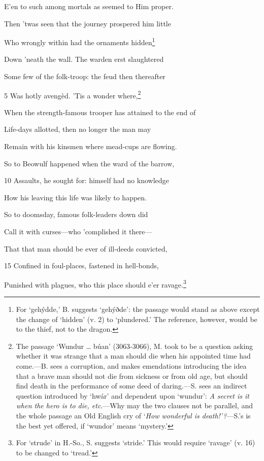 E’en to such among mortals as seemed to Him proper.



Then ’twas seen that the journey prospered him little

Who wrongly within had the ornaments hidden\footnote{For ‘gehýdde,’ B. suggests ‘gehýðde’: the passage would stand as above
except the change of ‘hidden’ (v. 2) to ‘plundered.’ The reference, however,
would be to the thief, not to the dragon.}

Down ’neath the wall. The warden erst slaughtered

Some few of the folk-troop: the feud then thereafter

5
Was hotly avengèd. ’Tis a wonder where,\footnote{The passage ‘Wundur … búan’ (3063-3066), M. took to be a question
asking whether it was strange that a man should die when his appointed time
had come.—B. sees a corruption, and makes emendations introducing the
idea that a brave man should not die from sickness or from old age, but should
find death in the performance of some deed of daring.—S. sees an indirect
question introduced by ‘hwár’ and dependent upon ‘wundur’: \emph{A secret is it
when the hero is to die, etc}.—Why may the two clauses not be parallel, and
the whole passage an Old English cry of ‘\emph{How wonderful is death!’?}—S.’s
is the best yet offered, if ‘wundor’ means ‘mystery.’}

When the strength-famous trooper has attained to the end of

Life-days allotted, then no longer the man may

Remain with his kinsmen where mead-cups are flowing.

So to Beowulf happened when the ward of the barrow,

10
Assaults, he sought for: himself had no knowledge

How his leaving this life was likely to happen.

So to doomsday, famous folk-leaders down did

Call it with curses—who ’complished it there—

That that man should be ever of ill-deeds convicted,

15
Confined in foul-places, fastened in hell-bonds,

Punished with plagues, who this place should e’er ravage.\footnote{For ‘strude’ in H.-So., S. suggests ‘stride.’ This would require ‘ravage’
(v. 16) to be changed to ‘tread.’}

